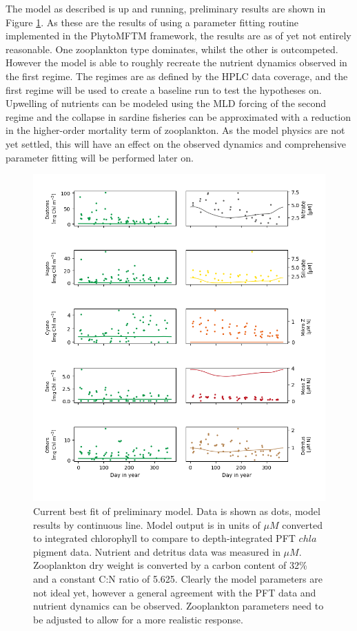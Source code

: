 The model as described is up and running, preliminary results are shown in Figure \ref{PrelimRes}. As these are the results of using a parameter fitting routine implemented in the PhytoMFTM framework, the results are as of yet not entirely reasonable. One zooplankton type dominates, whilst the other is outcompeted. However the model is able to roughly recreate the nutrient dynamics observed in the first regime. The regimes are as defined by the HPLC data coverage, and the first regime will be used to create a baseline run to test the hypotheses on. Upwelling of nutrients can be modeled using the MLD forcing of the second regime and the collapse in sardine fisheries can be approximated with a reduction in the higher-order mortality term of zooplankton. As the model physics are not yet settled, this will have an effect on the observed dynamics and comprehensive parameter fitting will be performed later on. 

\begin{figure}
\centering
\includegraphics[trim = 0mm 0mm 0mm 0mm, clip, width=1.\linewidth]{./Chp2-Pre/Figure_1.png}
\caption[Scheme]{\small {Current best fit of preliminary model. Data is shown as dots, model results by continuous line. Model output is in units of $\mu M$ converted to integrated chlorophyll to compare to depth-integrated PFT $chl a$ pigment data.  Nutrient and detritus data was measured in $\mu M$. Zooplankton dry weight is converted by a carbon content of 32\% and a constant C:N ratio of 5.625. Clearly the model parameters are not ideal yet, however a general agreement with the PFT data and nutrient dynamics can be observed. Zooplankton parameters need to be adjusted to allow for a more realistic response.}}
\label{PrelimRes}
\end{figure}





